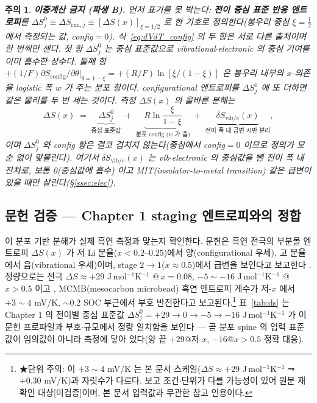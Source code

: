 \documentclass[11pt,a4paper]{article}
\newtheorem*{warnbox}{주의}
\newcommand{\rxn}{\mathrm{rxn}}
\newcommand{\config}{\mathrm{config}}
\newcommand{\vib}{\mathrm{vib}}
\begin{document}
\begin{warnbox}
\textbf{이중계산 금지 (파생 B).} 먼저 표기를 못 박는다: \textbf{전이 중심 표준 반응 엔트로피}를
$\Delta S^0_j\equiv\Delta S_{\rxn,j}\equiv[\Delta S(x)]_{\xi=1/2}$ 로 한 기호로 정의한다(봉우리 중심 $\xi=\tfrac12$
에서 측정되는 값, config$=0$). 식~\eqref{eq:dVdT_config} 의 두 항은 \emph{서로 다른 출처}이며 한 번씩만 센다.
첫 항 $\Delta S^0_j$ 는 중심 표준값으로 vibrational$\cdot$electronic 의 중심 기여를 이미 흡수한 상수다. 둘째 항
$+(1/F)\partial S_\config/\partial\theta|_{\theta=1-\xi}=+(R/F)\ln[\xi/(1-\xi)]$ 은 봉우리 \emph{내부}의 $x$-의존을
logistic 폭 $w$ 가 주는 \emph{분포 항}이다. configurational 엔트로피를 $\Delta S^0_j$ 에 \emph{또} 더하면 같은
물리를 두 번 세는 것이다. 측정 $\Delta S(x)$ 의 올바른 분해는
\[
\Delta S(x) \;=\; \underbrace{\Delta S^0_j}_{\text{중심 표준값}}
\;+\;\underbrace{R\ln\frac{\xi}{1-\xi}}_{\text{분포 config (}w\text{ 가 줌)}}
\;+\;\underbrace{\delta S_{\vib/e}(x)}_{\text{전이 폭 내 급변 시만 분리}},
\]
이며 $\Delta S^0_j$ 와 config 항은 결코 겹치지 않는다(중심에서 config$=0$ 이므로 정의가 모순 없이 맞물린다).
여기서 $\delta S_{\vib/e}(x)$ 는 vib$\cdot$electronic 의 \emph{중심값을 뺀} 전이 폭 내 잔차로, 보통 0(중심값에 흡수)
이고 MIT(insulator-to-metal transition) 같은 급변이 있을 때만 살린다(\S\ref{ssec:elec}).
\end{warnbox}

\subsection{문헌 검증 — Chapter 1 staging 엔트로피와의 정합}
이 분포 기반 분해가 실제 흑연 측정과 맞는지 확인한다. 문헌은 흑연 전극의 부분몰 엔트로피 $\Delta S(x)$ 가
저 Li 분율($x<0.2$--$0.25$)에서 양(configurational 우세), 고 분율에서 음(vibrational 우세)이며, stage
$2\to1$($x\approx0.5$)에서 급변을 보인다고 보고한다 \cite{reynier2003,allart2018}. 정량으로는 전극
$\Delta S\approx+29$ J\,mol$^{-1}$K$^{-1}$ @\,$x=0.08$, $-5\sim-16$ J\,mol$^{-1}$K$^{-1}$ @\,$x>0.5$ 이고
\cite{allart2018}, MCMB(mesocarbon microbead) 흑연 엔트로피 계수가 저-$x$ 에서 $+3\sim4$ mV/K,
$\sim0.2$ SOC 부근에서 부호 반전한다고 보고된다\cite{msmr_partII}.\footnote{★단위 주의: 이 $+3\sim4$ mV/K 는
본 문서 스케일($\Delta S\approx+29$ J\,mol$^{-1}$K$^{-1}$ ⇒ $+0.30$ mV/K)과 자릿수가 다르다. 보고
조건$\cdot$단위가 다를 가능성이 있어 원문 재확인 대상[미검증]이며, 본 문서 입력값과 무관한 참고 인용이다.} 표~\ref{tab:ds} 는 Chapter 1 의 전이별 중심 표준값 $\Delta S^0_j=+29\to0\to-5\to-16$
J\,mol$^{-1}$K$^{-1}$ 가 이 문헌 프로파일과 부호$\cdot$규모에서 정량 일치함을 보인다 — 곧 분포 spine 의 입력
표준값이 임의값이 아니라 측정에 닿아 있다(양 끝 $+29$@저-$x$, $-16$@$x>0.5$ 정확 대응).
\end{document}
